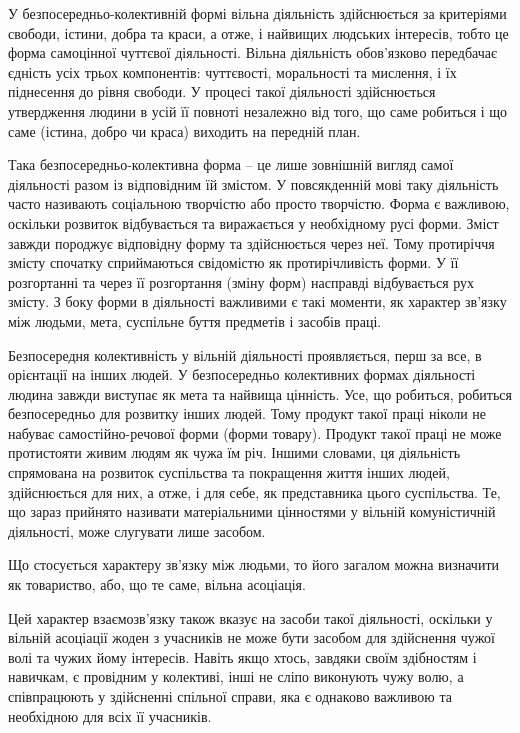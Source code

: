 \documentclass[../main]{subfiles}
\begin{document}
У безпосередньо-колективній формі вільна діяльність здійснюється за критеріями свободи, істини, добра та краси, а отже, і найвищих людських інтересів, тобто це форма самоцінної чуттєвої діяльності. Вільна діяльність обов’язково передбачає єдність усіх трьох компонентів: чуттєвості, моральності та мислення, і їх піднесення до рівня свободи. У процесі такої діяльності здійснюється утвердження людини в усій її повноті незалежно від того, що саме робиться і що саме (істина, добро чи краса) виходить на передній план.

Така безпосередньо-колективна форма – це лише зовнішній вигляд самої діяльності разом із відповідним їй змістом. У повсякденній мові таку діяльність часто називають соціальною творчістю або просто творчістю. Форма є важливою, оскільки розвиток відбувається та виражається у необхідному русі форми. Зміст завжди породжує відповідну форму та здійснюється через неї. Тому протиріччя змісту спочатку сприймаються свідомістю як протирічливість форми. У її розгортанні та через її розгортання (зміну форм) насправді відбувається рух змісту. З боку форми в діяльності важливими є такі моменти, як характер зв’язку між людьми, мета, суспільне буття предметів і засобів праці.

Безпосередня колективність у вільній діяльності проявляється, перш за все, в орієнтації на інших людей. У безпосередньо колективних формах діяльності людина завжди виступає як мета та найвища цінність. Усе, що робиться, робиться безпосередньо для розвитку інших людей. Тому продукт такої праці ніколи не набуває самостійно-речової форми (форми товару). Продукт такої праці не може протистояти живим людям як чужа їм річ. Іншими словами, ця діяльність спрямована на розвиток суспільства та покращення життя інших людей, здійснюється для них, а отже, і для себе, як представника цього суспільства. Те, що зараз прийнято називати матеріальними цінностями у вільній комуністичній діяльності, може слугувати лише засобом.

Що стосується характеру зв’язку між людьми, то його загалом можна визначити як товариство, або, що те саме, вільна асоціація.

Цей характер взаємозв’язку також вказує на засоби такої діяльності, оскільки у вільній асоціації жоден з учасників не може бути засобом для здійснення чужої волі та чужих йому інтересів. Навіть якщо хтось, завдяки своїм здібностям і навичкам, є провідним у колективі, інші не сліпо виконують чужу волю, а співпрацюють у здійсненні спільної справи, яка є однаково важливою та необхідною для всіх її учасників.
\end{document}
